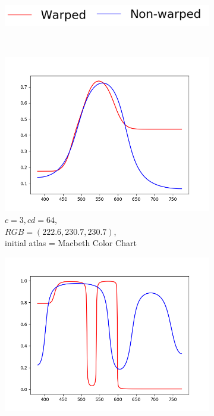 \begin{figure}[t]
	\centering
	\captionsetup[subfigure]{font=footnotesize,labelfont=footnotesize}
	\captionsetup[subfigure]{justification=centering}
	\begin{subfigure}[t]{0.38\textwidth}
		\includegraphics[width=\linewidth]{img/resultsTechniqueOpt_legend.png}
	\end{subfigure} \\
	\begin{subfigure}[t]{0.31\textwidth}
		\includegraphics[width=\linewidth]{img/resultsTechniqueOpt_m3_cd64.png}
		\caption{$c=3, cd=64$,\\$RGB=(222.6, 230.7, 230.7)$,\\initial atlas = Macbeth Color Chart}
		\label{fig:resultsTechniqueOpt_m3_cd64}
	\end{subfigure}
	\begin{subfigure}[t]{0.31\textwidth}
		\includegraphics[width=\linewidth]{img/resultsTechniqueOpt_m5_cd32.png}

\end{subfigure}
\end{figure}
